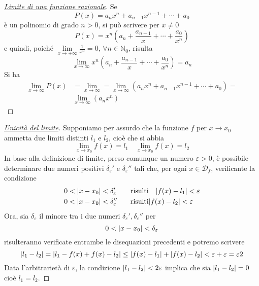 \begin{proof}
  [\protect\hyperlink{teor:limiteInfinitoFunzRaz}{Limite di una funzione razionale}]
  Se
  \begin{equation*}
    P(x)=a_nx^n+a_{n-1}x^{n-1}+\dotsb+a_0
  \end{equation*}
  è un polinomio di grado $n>0$, si può scrivere per $x\neq0$
  \begin{equation*}
    P(x) = x^n\left(a_n+\frac{a_{n-1}}{x}+\dotsb+\frac{a_0}{x^n}\right)
  \end{equation*}
  e quindi, poiché $\lim\limits_{x\to+\infty}\frac{1}{x^n}=0,\,\forall n\in\mathbb{N}_0$, risulta
  \begin{equation*}
    \lim\limits_{x\to\infty}x^n\left(a_n+\frac{a_{n-1}}{x}+\dotsb+\frac{a_0}{x^n}\right) = a_n
  \end{equation*}
  Si ha
  \begin{align*}
    \lim\limits_{x\to\infty}P(x)&=\lim\limits_{x\to\infty}=
    \lim\limits_{x\to\infty}\left(a_nx^n+a_{n-1}x^{n-1}+\dotsb+a_0\right)=\\
    &\lim\limits_{x\to\infty}\left(a_nx^n\right)
  \end{align*}
\end{proof}

\begin{proof}[\protect\hyperlink{teor:uniLim}{Unicità del limite}]
  Supponiamo per assurdo che la funzione $f$ per $x\to x_0$ ammetta due limiti distinti $l_1$ e 
  $l_2$, cioè che si abbia
  \begin{equation*}
    \lim\limits_{x\to x_0}f(x)=l_1\quad\lim\limits_{x\to x_0}f(x)=l_2
  \end{equation*}
  In base alla definizione di limite, preso comunque un numero $\varepsilon>0$, è possibile 
  determinare due numeri positivi $\delta_\varepsilon'$ e $\delta_\varepsilon''$ tali che, per ogni
  $x\in\mathscr{D}_f$, verificante la condizione
  \begin{align*}
    0&<\lvert x-x_0\rvert<\delta_\varepsilon' \quad&\text{risulti}&\quad\lvert f(x)-l_1\rvert<\varepsilon\\
    0&<\lvert x-x_0\rvert<\delta_\varepsilon'' &\text{risulti}&\lvert f(x)-l_2\rvert<\varepsilon\\
  \end{align*}
  Ora, sia $\delta_\varepsilon$ il minore tra i due numeri $\delta_\varepsilon',\delta_\varepsilon''$
  per
  \begin{equation*}
    0<\lvert x-x_0\rvert<\delta_\varepsilon
  \end{equation*}
  risulteranno verificate entrambe le disequazioni precedenti e potremo scrivere
  \begin{equation*}
    \lvert l_1-l_2\rvert=\lvert l_1-f(x)+f(x)-l_2\rvert\leq\lvert f(x)-l_1\rvert+\lvert f(x)-l_2\rvert<\varepsilon+\varepsilon=
    \varepsilon2
  \end{equation*}
  Data l'arbitrarietà di $\varepsilon$, la condizione $\lvert l_1-l_2\rvert<2\varepsilon$ implica che sia
  $\lvert l_1-l_2\rvert=0$ cioè $l_1=l_2$.
\end{proof}

